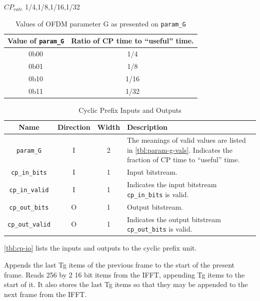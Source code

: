\documentclass[dvips,10pt,twocolumn]{article}
\newcommand{\wire}{\texttt}
\begin{document}
$CP_{rate}$ 1/4,1/8,1/16,1/32
	
	
	
	\begin{table}
	\begin{tabulary}{0.5\textwidth}{C|C}
		\label{tbl:param-g-vals}
		Value of \wire{param\_G} & Ratio of CP time to
		``useful'' time. \\ \hline

		0b00 & 1/4 \\
		0b01 & 1/8 \\
		0b10 & 1/16 \\
		0b11 & 1/32 \\

	\end{tabulary}
	\caption{Values of OFDM parameter G as presented on
	\wire{param\_G}}
	\end{table}

	\begin{table}
	\begin{tabularx}{\textwidth}{c|c|c|X}
		\label{tbl:cp-io}
		Name & Direction & Width & Description \\ \hline

		\wire{param\_G} & I & 2 & The meanings of valid values
		are listed in \autoref{tbl:param-g-vals}. Indicates the
		fraction of CP time to ``useful'' time.
		\\

		\wire{cp\_in\_bits} & I & 1 & Input bitstream. \\
		
		\wire{cp\_in\_valid} & I & 1 & Indicates the input
		bitstream \wire{cp\_in\_bits} is valid. \\

		\wire{cp\_out\_bits} & O & 1 & Output bitstream. \\

		\wire{cp\_out\_valid} & O & 1 & Indicates the output
		bitstream \wire{cp\_out\_bits} is valid.
	\end{tabularx}
	\caption{Cyclic Prefix Inputs and Outputs}
	\end{table}

	\autoref{tbl:cp-io} lists the inputs and outputs to the cyclic
	prefix unit.

	Appends the last Tg items of the previous frame to the start of the
	present frame.  Reads 256 by 2 16 bit items from the IFFT, appending Tg
	items to the start of it. It also stores the last Tg items so that
	they may be appended to the next frame from the IFFT.
\end{document}
